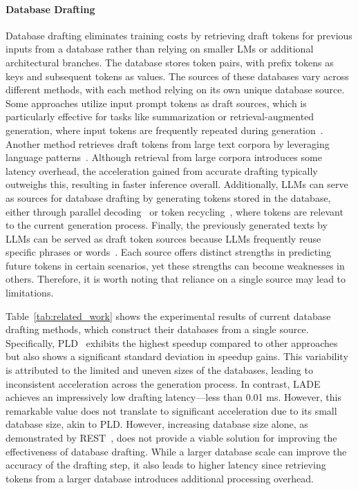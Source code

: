 \paragraph{Database Drafting}  
Database drafting eliminates training costs by retrieving draft tokens for previous inputs from a database rather than relying on smaller LMs or additional architectural branches. 
The database stores token pairs, with prefix tokens as keys and subsequent tokens as values.
The sources of these databases vary across different methods, with each method relying on its own unique database source. Some approaches utilize input prompt tokens as draft sources, which is particularly effective for tasks like summarization or retrieval-augmented generation, where input tokens are frequently repeated during generation~\cite{PLD, InfwRef}. Another method retrieves draft tokens from large text corpora by leveraging language patterns~\cite{REST}. 
Although retrieval from large corpora introduces some latency overhead, the acceleration gained from accurate drafting typically outweighs this, resulting in faster inference overall.
Additionally, LLMs can serve as sources for database drafting by generating tokens stored in the database, either through parallel decoding~\cite{ParallelDecoding, LAD} or token recycling~\cite{trashintotreasure}, where tokens are relevant to the current generation process. 
Finally, the previously generated texts by LLMs can be served as draft token sources because LLMs frequently reuse specific phrases or words~\cite{StagedSpec}.
Each source offers distinct strengths in predicting future tokens in certain scenarios, yet these strengths can become weaknesses in others. Therefore, it is worth noting that reliance on a single source may lead to limitations.



Table~\ref{tab:related_work} shows the experimental results of current database drafting methods, which construct their databases from a single source. 
Specifically, PLD~\cite{PLD} exhibits the highest speedup compared to other approaches but also shows a significant standard deviation in speedup gains. This variability is attributed to the limited and uneven sizes of the databases, leading to inconsistent acceleration across the generation process.
In contrast, LADE~\cite{LAD} achieves an impressively low drafting latency—less than 0.01 ms. However, this remarkable value does not translate to significant acceleration due to its small database size, akin to PLD. 
However, increasing database size alone, as demonstrated by REST~\cite{REST}, does not provide a viable solution for improving the effectiveness of database drafting. While a larger database scale can improve the accuracy of the drafting step, it also leads to higher latency since retrieving tokens from a larger database introduces additional processing overhead.

